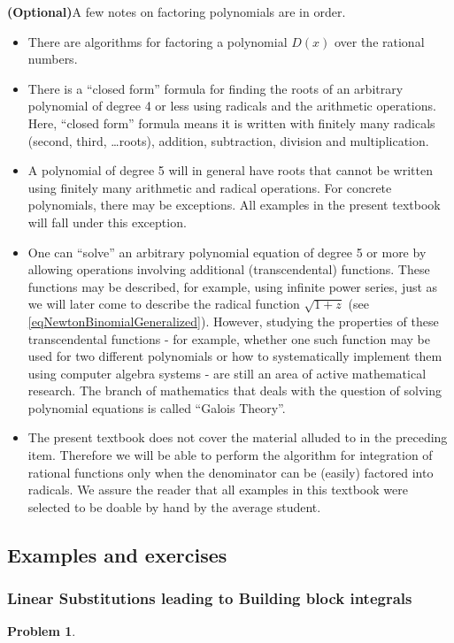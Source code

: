 \documentclass[12pt]{book}
\newtheorem{problem}[theorem]{Problem}
\newcommand{\optionalMaterial}{\textbf{(Optional)}}
\begin{document}
\optionalMaterial A few notes on factoring polynomials are in order.
\begin{itemize}
\item There are algorithms for factoring a polynomial $D(x)$ over the rational numbers.
\item There is a ``closed form'' formula for finding the roots of an arbitrary polynomial of degree 4 or less using radicals and the arithmetic operations. Here, ``closed form'' formula means it is written with finitely many radicals (second, third, \dots roots), addition, subtraction, division and multiplication.
\item A polynomial of degree 5 will in general have roots  that cannot be written using finitely many arithmetic and radical operations. For concrete polynomials, there may be exceptions. All examples in the present textbook will fall under this exception.
\item One can ``solve'' an arbitrary polynomial equation of degree 5 or more by allowing operations involving additional (transcendental) functions. These functions may be described, for example, using infinite power series, just as we will later come to describe the radical function $\sqrt{1+z}$ (see \eqref{eqNewtonBinomialGeneralized}). However, studying the properties of these transcendental functions - for example, whether one such function may be used for two different polynomials or how to systematically implement them using computer algebra systems - are still an area of active mathematical research. The branch of mathematics that deals with the question of solving polynomial equations is called ``Galois Theory''.
\item The present textbook does not cover the material alluded to in the preceding item. Therefore we will be able to perform the algorithm for integration of rational functions only when the denominator can be (easily) factored into radicals. We assure the reader that all examples in this textbook were selected to be doable by hand by the average student. 
\end{itemize}
\subsection{Examples and exercises}
\subsubsection{Linear Substitutions leading to Building block integrals}
\begin{problem}

\end{problem}

\end{document}

